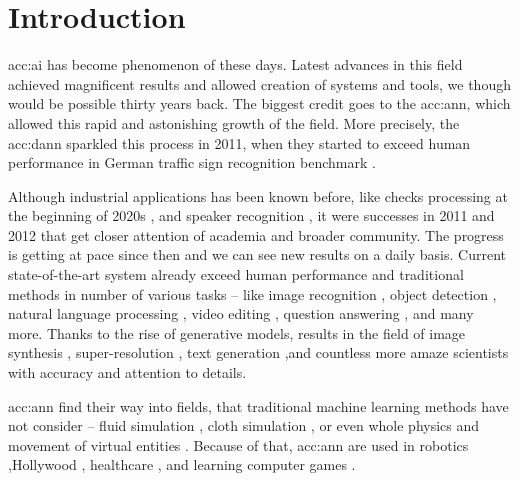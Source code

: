 \chapter{Introduction}

\acrfull{acc:ai} has become phenomenon of these days. Latest advances in this field achieved magnificent results and allowed creation of systems and tools, we though would be possible thirty years back. The biggest credit goes to the \acrfull{acc:ann}, which allowed this rapid and astonishing growth of the field. More precisely, the \acrfull{acc:dann} sparkled this process in 2011, when they started to exceed human performance in German traffic sign recognition benchmark \cite{CIRESAN2012333}.

Although industrial applications has been known before, like checks processing at the beginning of 2020s \cite{ChecksDocumentRecognition}, and speaker recognition \cite{HECK2000181}, it were successes in 2011 and 2012 that get closer attention of academia and broader community. The progress is getting at pace since then and we can see new results on a daily basis. Current state-of-the-art system already exceed human performance and traditional methods in number of various tasks -- like image recognition \cite{pham2021meta}\cite{ZawadzkaGosk2019}, object detection \cite{ghiasi2020simple}\cite{lehner2019patch}, natural language processing \cite{gpt3}, video editing \cite{lu2020layered}, question answering \cite{yamada2020luke}\cite{yamada2020luke}, and many more. Thanks to the rise of generative models, results in the field of image synthesis \cite{StateOfTheArtImageSythesis} \cite{esser2020taming}\cite{dalle}, super-resolution \cite{Sun_2020}\linebreak\cite{Chadha_2020}, text generation \cite{gpt3}\cite{malmi2019encode},\linebreak and countless more amaze scientists with accuracy and attention to details.

\acrshort{acc:ann} find their way into fields, that traditional machine learning methods have not consider -- fluid simulation \cite{um2018liquid}\cite{Kim_2019}, cloth simulation \cite{lee2019efficient}\cite{SRBO20}, or even whole physics \cite{PhysicsSimulation}\cite{sanchezgonzalez2020learning} and movement of virtual entities \cite{PhysicsBasedCharaterSImulation}\cite{zhang2020vid2player}. Because of that, \acrshort{acc:ann} are used in robotics \cite{pierson2017deep}\cite{Lee_2020},Hollywood \cite{aiinhollywood},  healthcare \cite{fakoor2013using}\cite{BreastCancerAISystem}, and learning computer games \cite{openai2019dota}\cite{alphastar}.
